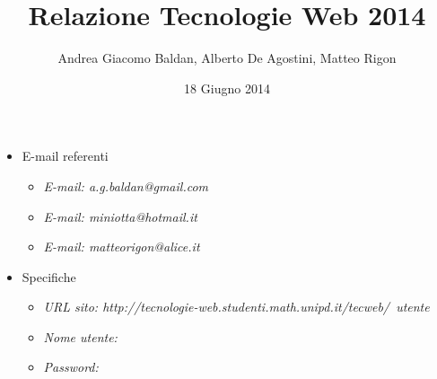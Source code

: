 \documentclass[a4paper, 12pt]{article}
\title{Relazione Tecnologie Web 2014}
\author{Andrea Giacomo Baldan, Alberto De Agostini, Matteo Rigon}
\date{18 Giugno 2014}
\begin{document}
\maketitle

\begin{itemize}
\item E-mail referenti
  \begin{itemize}
  \item \emph{E-mail: a.g.baldan@gmail.com}
  \item \emph{E-mail: miniotta@hotmail.it}
  \item \emph{E-mail: matteorigon@alice.it}
  \end{itemize}
\item Specifiche
  \begin{itemize}
  \item \emph{URL sito: http://tecnologie-web.studenti.math.unipd.it/tecweb/~utente}
  \item \emph{Nome utente: }
  \item \emph{Password: }
  \end{itemize}
\end{itemize}

%
%
%

\end{document}
